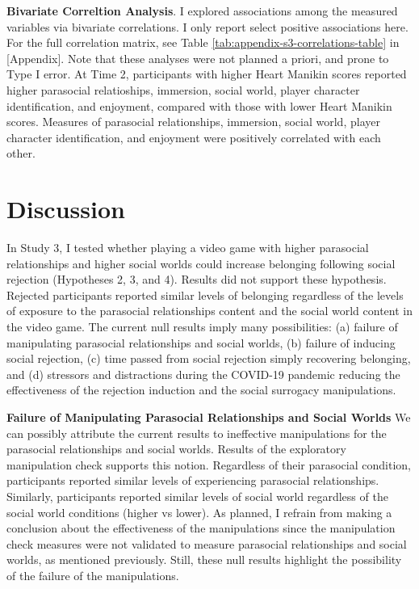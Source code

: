 \documentclass[
]{udthesis}
\begin{document}
\textbf{Bivariate Correltion Analysis}. I explored associations among the
measured variables via bivariate correlations. I only report select
positive associations here. For the full correlation matrix, see Table
\ref{tab:appendix-s3-correlations-table} in {[}Appendix{]}. Note that these
analyses were not planned a priori, and prone to Type I error. At Time
2, participants with higher Heart Manikin scores reported higher
parasocial relatioships, immersion, social world, player character
identification, and enjoyment, compared with those with lower Heart
Manikin scores. Measures of parasocial relationships, immersion, social
world, player character identification, and enjoyment were positively
correlated with each other.

\section{Discussion}\label{discussion-2}

In Study 3, I tested whether playing a video game with higher parasocial
relationships and higher social worlds could increase belonging
following social rejection (Hypotheses 2, 3, and 4). Results did not
support these hypothesis. Rejected participants reported similar levels
of belonging regardless of the levels of exposure to the parasocial
relationships content and the social world content in the video game.
The current null results imply many possibilities: (a) failure of
manipulating parasocial relationships and social worlds, (b) failure of
inducing social rejection, (c) time passed from social rejection simply
recovering belonging, and (d) stressors and distractions during the
COVID-19 pandemic reducing the effectiveness of the rejection induction
and the social surrogacy manipulations.

\textbf{Failure of Manipulating Parasocial Relationships and Social Worlds}
We can possibly attribute the current results to ineffective
manipulations for the parasocial relationships and social worlds.
Results of the exploratory manipulation check supports this notion.
Regardless of their parasocial condition, participants reported similar
levels of experiencing parasocial relationships. Similarly, participants
reported similar levels of social world regardless of the social world
conditions (higher vs lower). As planned, I refrain from making a
conclusion about the effectiveness of the manipulations since the
manipulation check measures were not validated to measure parasocial
relationships and social worlds, as mentioned previously. Still, these
null results highlight the possibility of the failure of the
manipulations.
\end{document}
